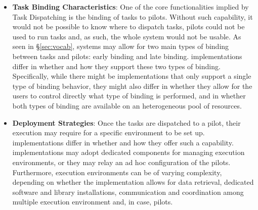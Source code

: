 \documentclass{sig-alternate}
\begin{document}
\begin{itemize}
\item \textbf{Task Binding Characteristics}: One of the core
  functionalities implied by Task Dispatching is the binding of tasks
  to pilots. Without such capability, it would not be possible to know
  where to dispatch tasks, pilots could not be used to run tasks and,
  as such, the whole \pilotjob system would not be usable. As seen in
  \S\ref{sec:vocab}, \pilotjob systems may allow for two main types of
  binding between tasks and pilots: early binding and late
  binding. \pilotjob implementations differ in whether and how they
  support these two types of binding. Specifically, while there might
  be implementations that only support a single type of binding
  behavior, they might also differ in whether they allow for the users
  to control directly what type of binding is performed, and in
  whether both types of binding are available on an heterogeneous pool
  of resources.


\item \textbf{Deployment Strategies}: Once the tasks are dispatched to
  a pilot, their execution may require for a specific environment to
  be set up.  \pilotjob implementations differ in whether and how they
  offer such a capability. \pilotjob implementations may adopt
  dedicated components for managing execution environments, or they
  may relay an ad hoc configuration of the pilots. Furthermore,
  execution environments can be of varying complexity, depending on
  whether the \pilotjob implementation allows for data retrieval,
  dedicated software and library installations, communication and
  coordination among multiple execution environment and, in case,
  pilots.

\end{itemize}

\end{document}
